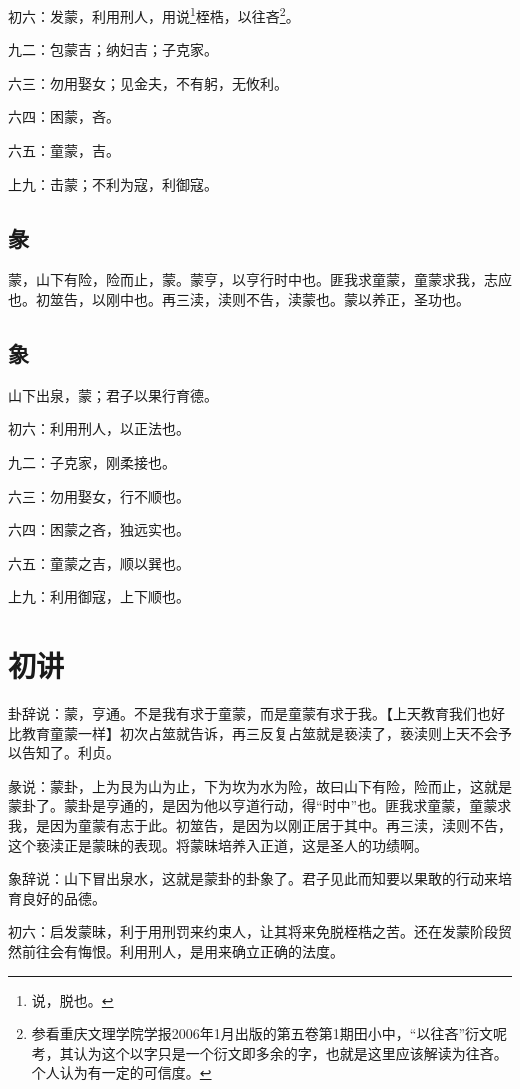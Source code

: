 \documentclass[12pt,oneside]{book}
\begin{document}
初六：发蒙，利用刑人，用说\footnote{说，脱也。}桎梏，以往吝\footnote{参看重庆文理学院学报2006年1月出版的第五卷第1期田小中，“以往吝”衍文呢考，其认为这个以字只是一个衍文即多余的字，也就是这里应该解读为往吝。个人认为有一定的可信度。}。

九二：包蒙吉；纳妇吉；子克家。

六三：勿用娶女；见金夫，不有躬，无攸利。

六四：困蒙，吝。

六五：童蒙，吉。

上九：击蒙；不利为寇，利御寇。

\subsection{彖}
蒙，山下有险，险而止，蒙。蒙亨，以亨行时中也。匪我求童蒙，童蒙求我，志应也。初筮告，以刚中也。再三渎，渎则不告，渎蒙也。蒙以养正，圣功也。


\subsection{象}
山下出泉，蒙；君子以果行育德。

初六：利用刑人，以正法也。

九二：子克家，刚柔接也。

六三：勿用娶女，行不顺也。

六四：困蒙之吝，独远实也。

六五：童蒙之吉，顺以巽也。

上九：利用御寇，上下顺也。

\section{初讲}
卦辞说：蒙，亨通。不是我有求于童蒙，而是童蒙有求于我。【上天教育我们也好比教育童蒙一样】初次占筮就告诉，再三反复占筮就是亵渎了，亵渎则上天不会予以告知了。利贞。

彖说：蒙卦，上为艮为山为止，下为坎为水为险，故曰山下有险，险而止，这就是蒙卦了。蒙卦是亨通的，是因为他以亨道行动，得“时中”也。匪我求童蒙，童蒙求我，是因为童蒙有志于此。初筮告，是因为以刚正居于其中。再三渎，渎则不告，这个亵渎正是蒙昧的表现。将蒙昧培养入正道，这是圣人的功绩啊。

象辞说：山下冒出泉水，这就是蒙卦的卦象了。君子见此而知要以果敢的行动来培育良好的品德。

初六：启发蒙昧，利于用刑罚来约束人，让其将来免脱桎梏之苦。还在发蒙阶段贸然前往会有悔恨。利用刑人，是用来确立正确的法度。
\end{document}
